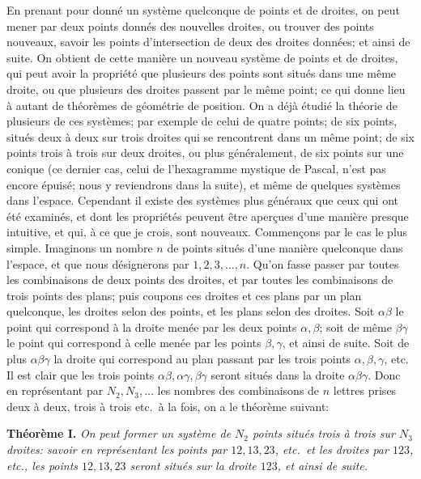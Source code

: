 \documentclass[12pt,a4paper]{article}
\begin{document}
En prenant pour donn\'e un syst\`eme quelconque de points et de droites, on peut mener par deux points donn\'es des nouvelles droites, ou trouver des points nouveaux, savoir les points d'intersection de deux des droites donn\'ees; et ainsi de suite. On obtient de cette mani\`ere un nouveau syst\`eme de points et de droites, qui peut avoir la propri\'et\'e que plusieurs des points sont situ\'es dans une m\^eme droite, ou que plusieurs des droites passent par le m\^eme point; ce qui donne lieu \`a autant de th\'eor\`emes de g\'eom\'etrie de position. On a d\'ej\`a \'etudi\'e la th\'eorie de plusieurs de ces syst\`emes; par exemple de celui de quatre points; de six points, situ\'es deux \`a deux sur trois droites qui se rencontrent dans un m\^eme point; de six points trois \`a trois sur deux droites, ou plus g\'en\'eralement, de six points sur une conique (ce dernier cas, celui de l'hexagramme mystique de Pascal, n'est pas encore \'epuis\'e; nous y reviendrons dans la suite), et m\^eme de quelques syst\`emes dans l'espace. Cependant il existe des syst\`emes plus g\'en\'eraux que ceux qui ont \'et\'e examin\'es, et dont les propri\'et\'es peuvent \^etre aper\c{c}ues d'une mani\`ere presque intuitive, et qui, \`a ce que je crois, sont nouveaux. Commen\c{c}ons par le cas le plus simple. Imaginons un nombre $n$ de points situ\'es d'une mani\`ere quelconque dans l'espace, et que nous d\'esignerons par $1, 2, 3, \ldots, n$. Qu'on fasse passer par toutes les combinaisons de deux points des droites, et par toutes les combinaisons de trois points des plans; puis coupons ces droites et ces plans par un plan quelconque, les droites selon des points, et les plans selon des droites. Soit $\alpha\beta$ le point qui correspond \`a la droite men\'ee par les deux points $\alpha, \beta$; soit de m\^eme $\beta\gamma$ le point qui correspond \`a celle men\'ee par les points $\beta, \gamma$, et ainsi de suite. Soit de plus $\alpha\beta\gamma$ la droite qui correspond au plan passant par les trois points $\alpha, \beta, \gamma$, etc. Il est clair que les trois points $\alpha\beta, \alpha\gamma, \beta\gamma$ seront situ\'es dans la droite $\alpha\beta\gamma$. Donc en repr\'esentant par $N_2, N_3,\ldots$ les nombres des combinaisons de $n$ lettres prises deux \`a deux, trois \`a trois etc.\ \`a la fois, on a le th\'eor\`eme suivant:

\textbf{Th\'eor\`eme I.} \emph{On peut former un syst\`eme de $N_2$ points situ\'es trois \`a trois sur $N_3$ droites: savoir en repr\'esentant les points par $12, 13, 23$, etc.\ et les droites par $123$, etc., les points $12, 13, 23$ seront situ\'es sur la droite $123$, et ainsi de suite.}
\end{document}
